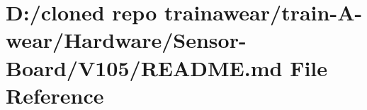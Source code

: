\hypertarget{_hardware_2_sensor-_board_2_v105_2_r_e_a_d_m_e_8md}{}\section{D\+:/cloned repo trainawear/train-\/\+A-\/wear/\+Hardware/\+Sensor-\/\+Board/\+V105/\+R\+E\+A\+D\+ME.md File Reference}
\label{_hardware_2_sensor-_board_2_v105_2_r_e_a_d_m_e_8md}
